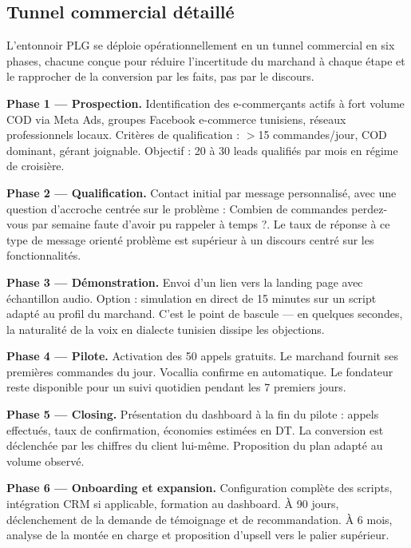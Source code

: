 \subsection{Tunnel commercial détaillé}
\label{section3.7.2}

L'entonnoir PLG se déploie opérationnellement en un tunnel commercial en six phases, chacune conçue pour réduire l'incertitude du marchand à chaque étape et le rapprocher de la conversion par les faits, pas par le discours.

\textbf{Phase 1 --- Prospection.} Identification des e-commerçants actifs à fort volume COD via Meta Ads, groupes Facebook e-commerce tunisiens, réseaux professionnels locaux. Critères de qualification : $>$15 commandes/jour, COD dominant, gérant joignable. Objectif : 20 à 30 leads qualifiés par mois en régime de croisière.

\textbf{Phase 2 --- Qualification.} Contact initial par message personnalisé, avec une question d'accroche centrée sur le problème : \og{}Combien de commandes perdez-vous par semaine faute d'avoir pu rappeler à temps ?\fg{}. Le taux de réponse à ce type de message orienté problème est supérieur à un discours centré sur les fonctionnalités.

\textbf{Phase 3 --- Démonstration.} Envoi d'un lien vers la landing page avec échantillon audio. Option : simulation en direct de 15 minutes sur un script adapté au profil du marchand. C'est le point de bascule --- en quelques secondes, la naturalité de la voix en dialecte tunisien dissipe les objections.

\textbf{Phase 4 --- Pilote.} Activation des 50 appels gratuits. Le marchand fournit ses premières commandes du jour. Vocallia confirme en automatique. Le fondateur reste disponible pour un suivi quotidien pendant les 7 premiers jours.

\textbf{Phase 5 --- Closing.} Présentation du dashboard à la fin du pilote : appels effectués, taux de confirmation, économies estimées en DT. La conversion est déclenchée par les chiffres du client lui-même. Proposition du plan adapté au volume observé.

\textbf{Phase 6 --- Onboarding et expansion.} Configuration complète des scripts, intégration CRM si applicable, formation au dashboard. À 90 jours, déclenchement de la demande de témoignage et de recommandation. À 6 mois, analyse de la montée en charge et proposition d'upsell vers le palier supérieur.


